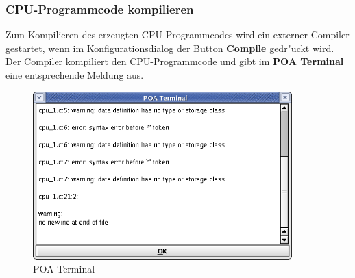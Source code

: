 \documentclass[a4paper,titlepage,12pt,ngerman]{scrbook}
\begin{document}
\newpage
\subsubsection{CPU-Programmcode kompilieren}
Zum Kompilieren des erzeugten CPU-Programmcodes wird ein externer Compiler gestartet, wenn im Konfigurationsdialog der Button {\bf Compile} gedr"uckt wird. Der Compiler kompiliert den CPU-Programmcode und gibt im {\bf POA Terminal} eine entsprechende Meldung aus.

\begin{figure}[htbp]

\begin{center}

\includegraphics[width=10cm]{Terminal}

\caption{POA Terminal}\label{test}

\end{center}

\end{figure}




\newpage
\end{document}
